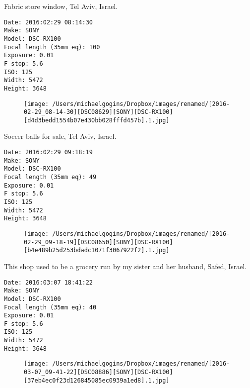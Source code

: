 \documentclass[11pt,letter,DIV=14,paper=landscape]{scrbook}
\begin{document}
\clearpage
\noindent Fabric store window, Tel Aviv, Israel.
\noindent
\begin{lstlisting}
Date: 2016:02:29 08:14:30
Make: SONY
Model: DSC-RX100
Focal length (35mm eq): 100
Exposure: 0.01
F stop: 5.6
ISO: 125
Width: 5472
Height: 3648
\end{lstlisting}
\clearpage

\begin{figure}
\texttt{[image: /Users/michaelgogins/Dropbox/images/renamed/[2016-02-29\_08-14-30][DSC08629][SONY][DSC-RX100][d4d3bedd1554b07e430bb028fffd457b].1.jpg]}
\end{figure}
    
\clearpage
\noindent Soccer balls for sale, Tel Aviv, Israel.
\noindent
\begin{lstlisting}
Date: 2016:02:29 09:18:19
Make: SONY
Model: DSC-RX100
Focal length (35mm eq): 49
Exposure: 0.01
F stop: 5.6
ISO: 125
Width: 5472
Height: 3648
\end{lstlisting}
\clearpage

\begin{figure}
\texttt{[image: /Users/michaelgogins/Dropbox/images/renamed/[2016-02-29\_09-18-19][DSC08650][SONY][DSC-RX100][b4e489b25d253bdadc1071f3067922f2].1.jpg]}
\end{figure}
    
\clearpage
\noindent This shop used to be a grocery run by my sister and her husband, Safed, Israel.
\noindent
\begin{lstlisting}
Date: 2016:03:07 18:41:22
Make: SONY
Model: DSC-RX100
Focal length (35mm eq): 40
Exposure: 0.01
F stop: 5.6
ISO: 125
Width: 5472
Height: 3648
\end{lstlisting}
\clearpage

\begin{figure}
\texttt{[image: /Users/michaelgogins/Dropbox/images/renamed/[2016-03-07\_09-41-22][DSC08886][SONY][DSC-RX100][37eb4ec0f23d126845085ec0939a1ed8].1.jpg]}
\end{figure}
    
\end{document}
